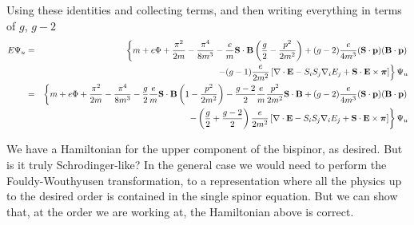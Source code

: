 Using these identities and collecting terms, and then writing everything in terms of $g$, $g-2$
\begin{eqnarray*}
	E \Psi_u 
		&=&\left\{ m + e\Phi + \frac{\pi^2}{2m} - \frac{\pi^4 } {8m^3}
			- \frac{e}{m} \mathbf{S} \cdot \mathbf{B} \left ( \frac{g}{2} - \frac{p^2}{2m^2} \right )
			+ (g-2)\frac{e}{4m^3} (\mathbf{S} \cdot \mathbf{p}) (\mathbf{B} \cdot \mathbf{p})	\right. \\
		&&	\left.
			- (g-1)\frac{e}{2m^2} 
				\left [ 
					\mathbf{\nabla} \cdot \mathbf{E} 
					- S_i S_j \nabla_i E_j +\mathbf{S} \cdot \mathbf{E} \times \mbox{\boldmath$ \pi $}
				\right ]
			\right\}\Psi_u	\\
		&=& \left\{ m + e\Phi + \frac{\pi^2}{2m} - \frac{\pi^4 } {8m^3}
			- \frac{g}{2}\frac{e}{m} \mathbf{S} \cdot \mathbf{B} \left ( 1 - \frac{p^2}{2m^2} \right )
			- \frac{g-2}{2} \frac{e}{m} \frac{p^2}{2m^2} \mathbf{S} \cdot \mathbf{B} 
			+ (g-2)\frac{e}{4m^3} (\mathbf{S} \cdot \mathbf{p}) (\mathbf{B} \cdot \mathbf{p})	\right.	\\
		&&	\left.
			- \left ( \frac{g}{2} + \frac{g-2}{2} \right) \frac{e}{2m^2} 
				\left [ 
					\mathbf{\nabla} \cdot \mathbf{E} 
					- S_i S_j \nabla_i E_j +\mathbf{S} \cdot \mathbf{E} \times \mbox{\boldmath$ \pi $}
				\right ]
			\right\}\Psi_u
\end{eqnarray*}
			
We have a Hamiltonian for the upper component of the bispinor, as desired.  But is it truly Schrodinger-like?  In the general case we would need to perform the Fouldy-Wouthyusen transformation, to a representation where all the physics up to the desired order is contained in the single spinor equation.  But we can show that, at the order we are working at, the Hamiltonian above is correct.



